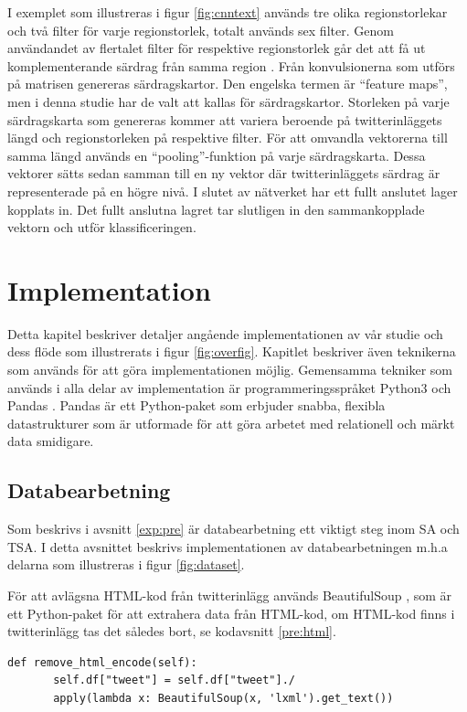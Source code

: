 \documentclass{kaumasters} %
\begin{document}
I exemplet som illustreras i figur \ref{fig:cnntext} används tre olika regionstorlekar och två filter för varje regionstorlek, totalt används sex filter. Genom användandet av flertalet filter för respektive regionstorlek går det att få ut komplementerande särdrag från samma region \cite{cnn:002}. Från konvulsionerna som utförs på matrisen genereras särdragskartor. Den engelska termen är “feature maps”, men i denna studie har de valt att kallas för särdragskartor.  Storleken på varje särdragskarta som genereras kommer att variera beroende på twitterinläggets längd och regionstorleken på respektive filter. För att omvandla vektorerna till samma längd används en “pooling”-funktion på varje särdragskarta. Dessa vektorer sätts sedan samman till en ny vektor där twitterinläggets särdrag är representerade på en högre nivå. I slutet av nätverket har ett fullt anslutet lager kopplats in. Det fullt anslutna lagret tar slutligen in den sammankopplade vektorn och utför klassificeringen.



\section{Implementation}\label{impl}
Detta kapitel beskriver detaljer angående implementationen av vår studie och dess flöde som illustrerats i figur \ref{fig:overfig}. Kapitlet beskriver även teknikerna som används för att göra implementationen möjlig. Gemensamma tekniker som används i alla delar av implementation är programmeringsspråket Python3 \cite{impl:001} och Pandas \cite{impl:002}. Pandas är ett Python-paket som erbjuder snabba, flexibla datastrukturer som är utformade för att göra arbetet med relationell och märkt data smidigare. 
\subsection{Databearbetning}\label{impl:pre}
Som beskrivs i avsnitt \ref{exp:pre} är databearbetning ett viktigt steg inom SA och TSA. I detta avsnittet beskrivs implementationen av databearbetningen m.h.a delarna som illustreras i figur \ref{fig:dataset}.

För att avlägsna HTML-kod från twitterinlägg används BeautifulSoup \cite{impl:004}, som är ett Python-paket för att extrahera data från HTML-kod, om HTML-kod finns i twitterinlägg tas det således bort, se kodavsnitt \ref{pre:html}.
\begin{lstlisting}[style=mypython,caption={Funktion för att avlägsna HTML-kod.},label=pre:html]
def remove_html_encode(self):
       self.df["tweet"] = self.df["tweet"]./
       apply(lambda x: BeautifulSoup(x, 'lxml').get_text())
\end{lstlisting}
\end{document}
